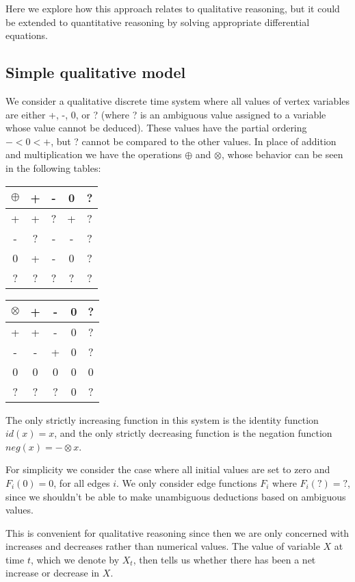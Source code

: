 \documentclass[a4paper,11pt]{article}
\begin{document}
Here we explore how this approach relates to qualitative reasoning,
but it could be extended to quantitative reasoning by solving
appropriate differential equations.

\subsection{Simple qualitative model}

We consider a qualitative discrete time system where all values of
vertex variables are either +, -, 0, or ? (where ? is an ambiguous value assigned
to a variable whose value cannot be deduced). These values have the partial
ordering $- < 0 < +$, but ? cannot be compared to the other values. In place of
addition and multiplication we have the operations $\oplus$ and $\otimes$, whose
behavior can be seen in the following tables:
\begin{center}
\begin{tabular}{c|cccc}
$\oplus$ & + & - & 0 & ?\\
\hline
  +   & +  & ? & + & ?\\
  -   & ?  & - & - & ?\\
  0   & +  & - & 0 & ?\\
  ?   & ?  & ? & ? & ?\\
\end{tabular}
\quad
\begin{tabular}{c|cccc}
$\otimes$ & + & - & 0 & ?\\
\hline
  +   & +  & - & 0 & ?\\
  -   & -  & + & 0 & ?\\
  0   & 0  & 0 & 0 & 0\\
  ?   & ?  & ? & 0 & ?\\
\end{tabular}
\end{center}
The only
strictly increasing function in this system is the identity function $id(x) =
x$, and the only strictly decreasing function is the negation function $neg(x) =-\otimes x$.

For simplicity we consider the case where all initial values are
set to zero and $F_i(0)=0$, for all edges $i$. We only consider edge functions
$F_i$ where $F_i(?) = ?$, since we shouldn't be able to make unambiguous
deductions based on ambiguous values.
%

This is convenient for qualitative reasoning since then we are only
concerned with increases and decreases rather than numerical values.
%
The value of variable $X$ at time $t$, which we denote by $X_t$, then tells us whether there has been a net
increase or decrease in $X$.
\end{document}

